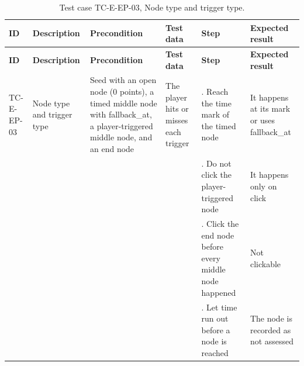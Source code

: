 {\footnotesize{}\renewcommand{\arraystretch}{1.1}
\begin{longtable}{|>{\raggedright\arraybackslash}p{}|>{\raggedright\arraybackslash}p{}|>{\raggedright\arraybackslash}p{}|>{\raggedright\arraybackslash}p{}|>{\raggedright\arraybackslash}p{}|>{\raggedright\arraybackslash}p{}|}
\caption{Test case TC-E-EP-03, Node type and trigger type.} \\
\hline
\textbf{ID} & \textbf{Description} & \textbf{Precondition} & \textbf{Test data} & \textbf{Step} & \textbf{Expected result} \\ \hline
\endfirsthead
\hline
\textbf{ID} & \textbf{Description} & \textbf{Precondition} & \textbf{Test data} & \textbf{Step} & \textbf{Expected result} \\ \hline
\endhead
TC-E-EP-03 & Node type and trigger type & Seed with an open node (0 points), a timed middle node with fallback\_\allowbreak{}at, a player-\allowbreak{}triggered middle node, and an end node & The player hits or misses each trigger & 1. Reach the time mark of the timed node & It happens at its mark or uses fallback\_at \\ \cline{5-6}
 &  &  &  & 2. Do not click the player-\allowbreak{}triggered node & It happens only on click \\ \cline{5-6}
 &  &  &  & 3. Click the end node before every middle node happened & Not clickable \\ \cline{5-6}
 &  &  &  & 4. Let time run out before a node is reached & The node is recorded as not assessed \\ \hline
\end{longtable}
}

